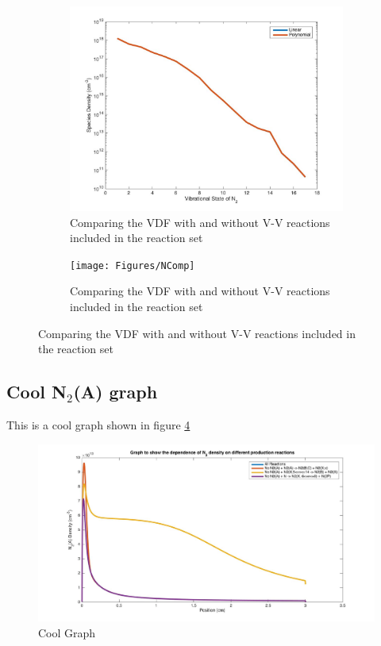 \documentclass[11pt, oneside]{article}   	%
\begin{document}
\begin{figure}
\begin{subfigure}{0.5\textwidth}
\begin{center}
\includegraphics[width=\textwidth]{Figures/VDF}
\caption{Comparing the VDF with and without V-V reactions included in the reaction set}
\label{fig:VDFComp}
\end{center}
\end{subfigure}
\begin{subfigure}{0.5\textwidth}
\begin{center}
\texttt{[image: Figures/NComp]}
\caption{Comparing the VDF with and without V-V reactions included in the reaction set}
\label{fig:NComp}
\end{center}
\end{subfigure}
\end{figure}


\subsection{Cool N$_2$(A) graph}
This is a cool graph shown in figure \ref{fig:N2A}

\begin{figure}
\includegraphics[width=\textwidth]{Figures/N2Adependence}
\caption{Cool Graph}
\label{fig:N2A}
\end{figure}
\end{document}
